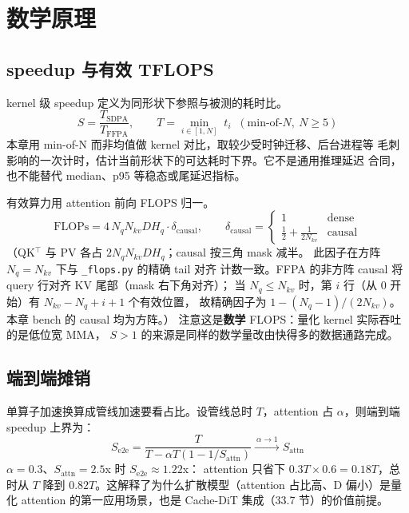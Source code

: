 
\section{数学原理}

\subsection{speedup 与有效 TFLOPS}

kernel 级 speedup 定义为同形状下参照与被测的耗时比。
\begin{equation}
  S=\frac{T_{\mathrm{SDPA}}}{T_{\mathrm{FFPA}}},\qquad
  T=\min_{i\in[1,N]}\;t_i\;\;(\text{min-of-}N,\ N\ge5)
\end{equation}
本章用 min-of-N 而非均值做 kernel 对比，取较少受时钟迁移、后台进程等
毛刺影响的一次计时，估计当前形状下的可达耗时下界。它不是通用推理延迟
合同，也不能替代 median、p95 等稳态或尾延迟指标。

有效算力用 attention 前向 FLOPS 归一。
\begin{equation}
  \mathrm{FLOPs}=4\,N_qN_{kv}DH_q\cdot\delta_{\mathrm{causal}},\qquad
  \delta_{\mathrm{causal}}=
  \begin{cases}1 & \text{dense}\\[2pt] \tfrac{1}{2}+\tfrac{1}{2N_{kv}} & \text{causal}\end{cases}
\end{equation}
（QK$^\top$ 与 PV 各占 $2N_qN_{kv}DH_q$；causal 按三角 mask 减半。
此因子在方阵 $N_q=N_{kv}$ 下与 \texttt{\_flops.py} 的精确 tail 对齐
计数一致。FFPA 的非方阵 causal 将 query 行对齐 KV 尾部（mask 右下角对齐）；
当 $N_q\le N_{kv}$ 时，第 $i$ 行（从 0 开始）有 $N_{kv}-N_q+i+1$ 个有效位置，
故精确因子为 $1-(N_q-1)/(2N_{kv})$。本章 bench 的 causal 均为方阵。）
注意这是\textbf{数学} FLOPS：量化 kernel 实际吞吐的是低位宽 MMA，
$S>1$ 的来源是同样的数学量改由快得多的数据通路完成。

\subsection{端到端摊销}

单算子加速换算成管线加速要看占比。设管线总时 $T$，attention 占
$\alpha$，则端到端 speedup 上界为：
\begin{equation}
  S_{\mathrm{e2e}}=\frac{T}{T-\alpha T(1-1/S_{\mathrm{attn}})}
  \xrightarrow{\ \alpha\to1\ }S_{\mathrm{attn}}
  \label{eq:33-e2e}
\end{equation}
$\alpha=0.3$、$S_{\mathrm{attn}}=2.5$x 时 $S_{\mathrm{e2e}}\approx1.22$x：
attention 只省下 $0.3T\times0.6=0.18T$，总时从 $T$ 降到
$0.82T$。这解释了为什么扩散模型（attention 占比高、D 偏小）是量化 attention
的第一应用场景，也是 Cache-DiT 集成（33.7 节）的价值前提。

